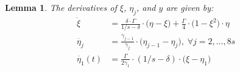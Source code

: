 \documentclass[a4paper,12pt]{article}
\newtheorem{lemma}{Lemma}
\begin{document}
\begin{lemma}
The derivatives of ${\xi}$, ${\eta}_j$, and ${y}$ are given by:
\begin{align}
\dot{\xi} & = \frac{\delta \cdot \Gamma}{1/s - \delta} \cdot \bigl(\eta - \xi \bigr) + \frac{\Gamma}{4} \cdot \bigl(1 - \xi^2 \bigr) \cdot \eta \label{xi_dot_def} \\
\dot{\eta_j} & =  \frac{\gamma_{j-1}}{\gamma_j} \cdot  \bigl(\eta_{j-1} - \eta_j\bigr), \; \forall j = 2, \ldots, 8s \; \; \label{eta_j_dot_def} \\
\dot{\eta_1}(t) & = \frac{\Gamma}{2 \gamma_1} \cdot (1/s - \delta) \cdot \bigl(\xi - \eta_1\bigr) \label{eta_1_dot_def}\\
\end{align}
\end{lemma}
\end{document}
